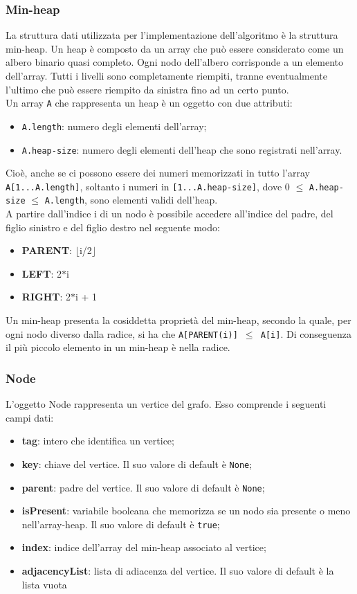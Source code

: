 \subsubsection{Min-heap}
La struttura dati utilizzata per l'implementazione dell'algoritmo è la struttura min-heap. Un heap è composto da un array che può essere considerato come un albero binario quasi completo. Ogni nodo dell'albero corrisponde a un elemento dell'array. Tutti i livelli sono completamente riempiti, tranne eventualmente l'ultimo che può essere riempito da sinistra fino ad un certo punto.\\
Un array \texttt{A} che rappresenta un heap è un oggetto con due attributi:
\begin{itemize}
	\item \texttt{A.length}: numero degli elementi dell'array;
	\item \texttt{A.heap-size}: numero degli elementi dell'heap che sono registrati nell'array.
\end{itemize}
Cioè, anche se ci possono essere dei numeri memorizzati in tutto l'array \texttt{A[1...A.length]}, soltanto i numeri in \texttt{[1...A.heap-size]}, dove 0 $\leq$ \texttt{A.heap-size} $\leq$ \texttt{A.length}, sono elementi validi dell'heap.\\
A partire dall'indice i di un nodo è possibile accedere all'indice del padre, del figlio sinistro e del figlio destro nel seguente modo:
\begin{itemize}
	\item \textbf{PARENT}: $\lfloor$i/2$\rfloor$ 
	\item \textbf{LEFT}: 2$\ast$i
	\item \textbf{RIGHT}: 2$\ast$i + 1
\end{itemize}
Un min-heap presenta la cosiddetta proprietà del min-heap, secondo la quale, per ogni nodo diverso dalla radice, si ha che \texttt{A[PARENT(i)] $\leq$ A[i]}. Di conseguenza il più piccolo elemento in un min-heap è nella radice.

\subsubsection{Node}
L'oggetto Node rappresenta un vertice del grafo. Esso comprende i seguenti campi dati:
\begin{itemize}
	\item \textbf{tag}: intero che identifica un vertice;
	\item \textbf{key}: chiave del vertice. Il suo valore di default è \texttt{None};
	\item \textbf{parent}: padre del vertice. Il suo valore di default è \texttt{None};
	\item \textbf{isPresent}: variabile booleana che memorizza se un nodo sia presente o meno nell'array-heap. Il suo valore di default è \texttt{true};
	\item \textbf{index}: indice dell'array del min-heap associato al vertice; 
	\item \textbf{adjacencyList}: lista di adiacenza del vertice.
	Il suo valore di default è la lista vuota
\end{itemize}

